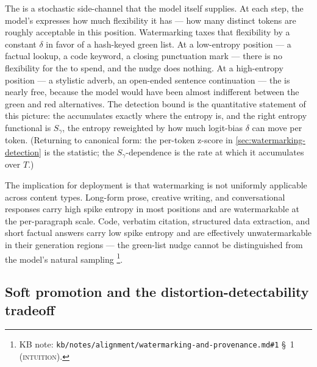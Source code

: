 \begin{intuition}
The  is a stochastic side-channel that the model itself
supplies. At each step, the model's  expresses how much
flexibility it has --- how many distinct tokens are roughly
acceptable in this position. Watermarking taxes that flexibility by a
constant $\delta$ in favor of a hash-keyed green list. At a low-entropy
position --- a factual lookup, a code keyword, a closing punctuation
mark --- there is no flexibility for the  to spend, and the
nudge does nothing. At a high-entropy position --- a stylistic
adverb, an open-ended sentence continuation --- the  is
nearly free, because the model would have been almost indifferent
between the green and red alternatives. The detection bound is the
quantitative statement of this picture: the  accumulates
exactly where the entropy is, and the right entropy functional is
$S_\gamma$, the entropy reweighted by how much logit-bias $\delta$
can move per token. (Returning to canonical form: the per-token
z-score in \cref{sec:watermarking-detection} is the statistic; the
$S_\gamma$-dependence is the rate at which it accumulates over $T$.)
\end{intuition}

The implication for deployment is that watermarking is not uniformly
applicable across content types. Long-form prose, creative writing,
and conversational responses carry high spike entropy in most
positions and are watermarkable at the per-paragraph scale. Code,
verbatim citation, structured data extraction, and short factual
answers carry low spike entropy and are effectively unwatermarkable in
their generation regions --- the green-list nudge cannot be
distinguished from the model's natural sampling%
\footnote{KB note: \nolinkurl{kb/notes/alignment/watermarking-and-provenance.md#1}
\S~1 (\textsc{intuition}).}.

\subsection{Soft promotion and the distortion-detectability tradeoff}
\label{sec:watermarking-soft}

